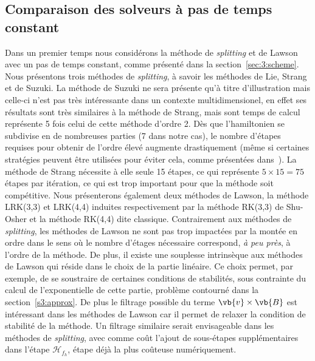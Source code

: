 
\FloatBarrier
\subsection{Comparaison des solveurs à pas de temps constant}

Dans un premier temps nous considérons la méthode de \emph{splitting} et de Lawson avec un pas de temps constant, comme présenté dans la section~\ref{sec:3:scheme}. Nous présentons trois méthodes de \emph{splitting}, à savoir les méthodes de Lie, Strang et de Suzuki. La méthode de Suzuki ne sera présente qu'à titre d'illustration mais celle-ci n'est pas très intéressante dans un contexte multidimensionel, en effet ses résultats sont très similaires à la méthode de Strang, mais sont temps de calcul représente 5 fois celui de cette méthode d'ordre 2. Dès que l'hamiltonien se subdivise en de nombreuses parties (7 dans notre cas), le nombre d'étapes requises pour obtenir de l'ordre élevé augmente drastiquement (même si certaines stratégies peuvent être utilisées pour éviter cela, comme présentées dans~\cite{Casas:2017}). La méthode de Strang nécessite à elle seule 15 étapes, ce qui représente $5\times15=75$ étapes par itération, ce qui est trop important pour que la méthode soit compétitive. Nous présenterons également deux méthodes de Lawson, la méthode LRK(3,3) et LRK(4,4) induites respectivement par la méthode RK(3,3) de Shu-Osher et la méthode RK(4,4) dite classique. Contrairement aux méthodes de \emph{splitting}, les méthodes de Lawson ne sont pas trop impactées par la montée en ordre dans le sens où le nombre d'étages nécessaire correspond, \emph{à peu près}, à l'ordre de la méthode. De plus, il existe une souplesse intrinsèque aux méthodes de Lawson qui réside dans le choix de la partie linéaire. Ce choix permet, par exemple, de se soustraire de certaines conditions de stabilités, sous contrainte du calcul de l'exponentielle de cette partie, problème contourné dans la section~\ref{s3:approx}. De plus le filtrage possible du terme $\vb{v}\times\vb{B}$ est intéressant dans les méthodes de Lawson car il permet de relaxer la condition de stabilité de la méthode. Un filtrage similaire serait envisageable dans les méthodes de \emph{splitting}, avec comme coût l'ajout de sous-étapes supplémentaires dans l'étape $\mathcal{H}_{f_h}$, étape déjà la plus coûteuse numériquement.


